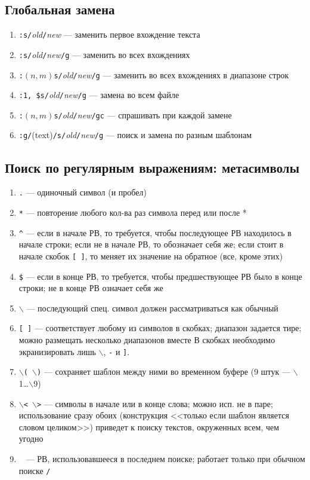 \documentclass[a4paper,10pt, twocolumn]{article}
\newcommand*{\cod}[1]{\texttt{#1}}
\begin{document}
\subsection{Глобальная замена}
\begin{enumerate}
    \item \cod{:s/}\textit{old}\cod{/}\textit{new} --- заменить первое вхождение текста
    \item \cod{:s/}\textit{old}\cod{/}\textit{new}\cod{/g} --- заменить во всех вхождениях
    \item \cod{:}$(n,m)$\cod{s/}\textit{old}\cod{/}\textit{new}\cod{/g} --- заменить во всех вхождениях в диапазоне строк
    \item \cod{:1, \$s/}\textit{old}\cod{/}\textit{new}\cod{/g} --- замена во всем файле
    \item \cod{:}$(n,m)$\cod{s/}\textit{old}\cod{/}\textit{new}\cod{/gc} --- спрашивать при каждой замене
    \item \cod{:g/}(text)\cod{/s/}\textit{old}\cod{/}\textit{new}\cod{/g} --- поиск и замена по разным шаблонам
\end{enumerate}

\subsection{Поиск по регулярным выражениям: метасимволы}
\begin{enumerate}
    \item \cod{.} --- одиночный символ (и пробел)
    \item \cod{*} --- повторение любого кол-ва раз символа перед или после *
    \item \cod{\^} --- если в начале РВ, то требуется, чтобы последующее РВ находилось в начале строки; если не в начале РВ, то обозначает себя же; если стоит в начале скобок \cod{[ ]}, то меняет их значение на обратное (все, кроме этих)
    \item \cod{\$} --- если в конце РВ, то требуется, чтобы предшествующее РВ было в конце строки; не в конце РВ означает себя же
    \item \cod{$\backslash$} --- последующий спец. символ должен рассматриваться как обычный
    \item \cod{[ ]} --- соответствует любому из символов в скобках; диапазон задается тире; можно размещать несколько диапазонов вместе
    В скобках необходимо экранизировать лишь \cod{$\backslash$}, \cod{-} и \cod{]}.
    \item \cod{$\backslash$( $\backslash$)} --- сохраняет шаблон между ними во временном буфере (9 штук --- $\backslash$1\dots$\backslash$9)
    \item \cod{$\backslash$< $\backslash$>} --- символы в начале или в конце слова; можно исп. не в паре; использование сразу обоих (конструкция <<только если шаблон является словом целиком>>) приведет к поиску текстов, окруженных всем, чем угодно
    \item \cod{~} --- РВ, использовавшееся в последнем поиске; работает только при обычном поиске \cod{/}
\end{enumerate}
    
\end{document}
